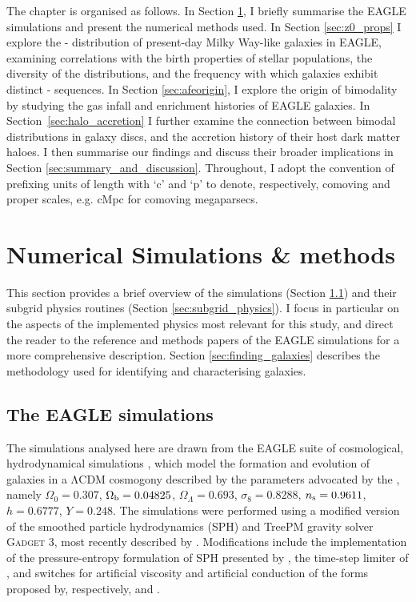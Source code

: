 The chapter is organised as follows. In Section \ref{sec:methods}, I briefly summarise the EAGLE simulations and present the numerical methods used. In Section \ref{sec:z0_props} I explore the \afe{}-\feh{} distribution of present-day Milky Way-like galaxies in EAGLE, examining correlations with the birth properties of stellar populations, the diversity of the distributions, and the frequency with which galaxies exhibit distinct \afe{}-\feh{} sequences. In Section \ref{sec:afeorigin}, I explore the origin of \afe{} bimodality by studying the gas infall and enrichment histories of EAGLE galaxies. In Section~\ref{sec:halo_accretion} I further examine the connection between bimodal \afe{} distributions in galaxy discs, and the accretion history of their host dark matter haloes. I then summarise our findings and discuss their broader implications in Section \ref{sec:summary_and_discussion}. Throughout, I adopt the convention of prefixing units of length with `c' and `p' to denote, respectively, comoving and proper scales, e.g. cMpc for comoving megaparsecs. 

\section{Numerical Simulations \& methods}
\label{sec:methods}

This section provides a brief overview of the simulations (Section \ref{sec:eagle}) and their subgrid physics routines (Section \ref{sec:subgrid_physics}). I focus in particular on the aspects of the implemented physics most relevant for this study, and direct the reader to the reference and methods papers of the EAGLE simulations for a more comprehensive description. Section \ref{sec:finding_galaxies} describes the methodology used for identifying and characterising galaxies. 

\subsection{The EAGLE simulations}
\label{sec:eagle}

The simulations analysed here are drawn from the EAGLE suite of cosmological, hydrodynamical simulations \citep{2015MNRAS.446..521S,2015MNRAS.450.1937C}, which model the formation and evolution of galaxies in a $\mathrm{\Lambda CDM}$ cosmogony described by the parameters advocated by the \citet{2014A&A...571A...1P}, namely {$\Omega_0 = 0.307$, $\Omega_{\rm b} = 0.04825$, $\Omega_\Lambda= 0.693$, $\sigma_8 = 0.8288$, $n_{\rm s} = 0.9611$, $h = 0.6777$, $Y = 0.248$}. The simulations were performed using a modified version of the smoothed particle hydrodynamics (SPH) and TreePM gravity solver \textsc{Gadget 3}, most recently described by \citet{2005MNRAS.364.1105S}. Modifications include the implementation of the pressure-entropy formulation of SPH presented by \citet{2013MNRAS.428.2840H}, the time-step limiter of \citet{2012MNRAS.419..465D}, and switches for artificial viscosity and artificial conduction of the forms proposed by, respectively, \citet{2010MNRAS.408..669C} and \citet{2010MNRAS.401.1475P}.

